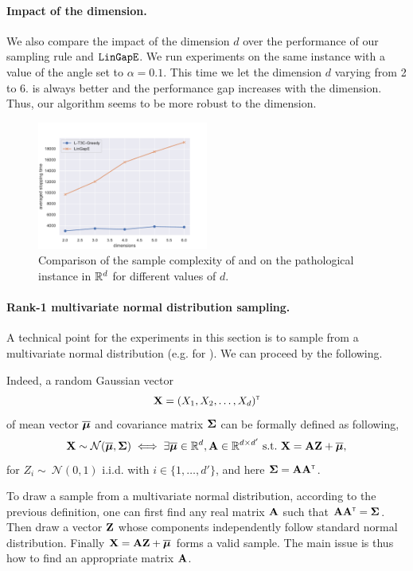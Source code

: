 \paragraph{Impact of the dimension.}
We also compare the impact of the dimension $d$ over the performance of our sampling rule and $\texttt{LinGapE}$. We run experiments on the same instance with a value of the angle set to $\alpha=0.1$. This time we let the dimension $d$ varying from 2 to 6. \LTCC{} is always better and the performance gap increases with the dimension. Thus, our algorithm seems to be more robust to the dimension.

\begin{figure}[ht]
    \centering
    \includegraphics[width=0.5\textwidth]{Chapter4/img/dims.pdf}
    \caption{Comparison of the sample complexity of \LTCCG{} and \LGapE{} on the pathological instance in $\mathbb{R}^d$ for different values of $d$.}
    \label{fig:dims}
\end{figure}

\paragraph{Rank-1 multivariate normal distribution sampling.}
A technical point for the experiments in this section is to sample from a multivariate normal distribution (e.g. for \LTCC{}). We can proceed by the following.

Indeed, a random Gaussian vector 
\[
    {\bf X} = (X_1, X_2, \ldots, X_d)^\mathsf{\scriptscriptstyle T}
\] 
of mean vector $\overline{{\boldsymbol \mu}}$ and covariance matrix ${\boldsymbol \Sigma}$ can be formally defined as following,
\[
    \bX \sim \cN(\bar{\bmu}, \bSigma) \iff \exists \bar{\bmu}\in\mathbb{R}^d,\bA\in\mathbb{R}^{d\times d'} \ \text{s.t.} \ \bX = \bA \mathbf{Z} + \bar{\bmu},
\]
for $Z_i \sim\ \mathcal{N}(0, 1)$ i.i.d. with $i\in\{1,\ldots,d'\}$, and here ${\boldsymbol \Sigma} = {\bf A}{\bf A}^\mathsf{\scriptscriptstyle T}$.

To draw a sample from a multivariate normal distribution, according to the previous definition, one can first find any real matrix ${\bf A}$ such that ${\bf A}{\bf A}^\mathsf{\scriptscriptstyle T} = {\boldsymbol \Sigma}$. Then draw a vector ${\bf Z}$ whose components independently follow standard normal distribution. Finally ${\bf X} = {\bf A} \mathbf{Z} + \overline{{\boldsymbol \mu}}$ forms a valid sample. The main issue is thus how to find an appropriate matrix ${\bf A}$.

